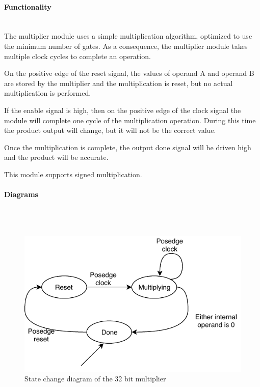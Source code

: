 \documentclass{article}
\begin{document}
    \paragraph{Functionality}
    \hfill\\
    The multiplier module uses a simple multiplication algorithm, optimized
    to use the minimum number of gates. As a consequence, the multiplier
    module takes multiple clock cycles to complete an operation.

    On the positive edge of the reset signal, the values of operand A
    and operand B are stored by the multiplier and the multiplication is
    reset, but no actual multiplication is performed.

    If the enable signal is high, then on the positive edge of the clock
    signal the module will complete one cycle of the multiplication 
    operation. During this time the product output will change, but it will
    not be the correct value.

    Once the multiplication is complete, the output done signal will be driven
    high and the product will be accurate.

    This module supports signed multiplication.

    \paragraph{Diagrams}
    \hfill\\\\
    \begin{figure}[H]
        \centering
        \includegraphics{../diagrams/alu/multiplier/multiplier_32.pdf}
        \caption{State change diagram of the 32 bit multiplier}
    \end{figure}
\end{document}
